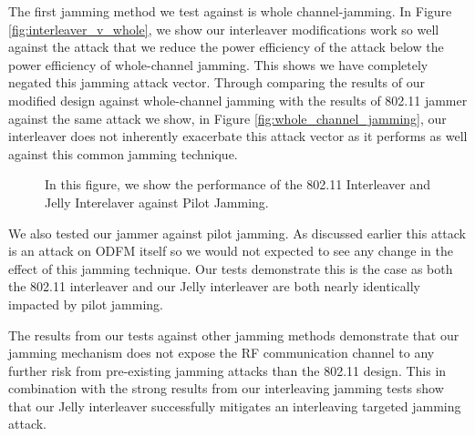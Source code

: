 \documentclass[sigconf]{acmart}
\begin{document}
The first jamming method we test against is whole channel-jamming. In Figure \ref{fig:interleaver_v_whole}, we show our interleaver modifications work so well against the attack that we reduce the power efficiency of the attack below the power efficiency of whole-channel jamming. This shows we have completely negated this jamming attack vector. Through comparing the results of our modified design against whole-channel jamming with the results of 802.11 jammer against the same attack we show, in Figure \ref{fig:whole_channel_jamming}, our interleaver does not inherently exacerbate this attack vector as it performs as well against this common jamming technique. 

\begin{figure}[ht]
    \centering
    
    
    \caption{In this figure, we show the performance of the 802.11 Interleaver and Jelly Interelaver against Pilot Jamming.}
    \label{fig:pilot_jamming}
\end{figure}

We also tested our jammer against pilot jamming. As discussed earlier this attack is an attack on ODFM itself so we would not expected to see any change in the effect of this jamming technique. Our tests demonstrate this is the case as both the 802.11 interleaver and our Jelly interleaver are both nearly identically impacted by pilot jamming. 

The results from our tests against other jamming methods demonstrate that our jamming mechanism does not expose the RF communication channel to any further risk from pre-existing jamming attacks than the 802.11 design. This in combination with the strong results from our interleaving jamming tests show that our Jelly interleaver successfully mitigates an interleaving targeted jamming attack.
\end{document}
